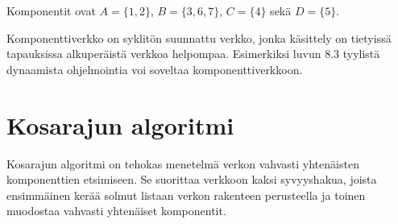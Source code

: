 \begin{center}
\end{center}

Komponentit ovat $A=\{1,2\}$,
$B=\{3,6,7\}$, $C=\{4\}$ sekä $D=\{5\}$.

Komponenttiverkko on syklitön suunnattu verkko,
jonka käsittely on tietyissä tapauksissa
alkuperäistä verkkoa helpompaa.
Esimerkiksi luvun 8.3 tyylistä dynaamista
ohjelmointia voi soveltaa komponenttiverkkoon.

\section{Kosarajun algoritmi}

% 
% 
% 
% 

Kosarajun algoritmi on tehokas
menetelmä verkon
vahvasti yhtenäisten komponenttien etsimiseen.
Se suorittaa verkkoon
kaksi syvyyshakua, joista ensimmäinen
kerää solmut listaan verkon rakenteen perusteella
ja toinen muodostaa vahvasti yhtenäiset komponentit.

